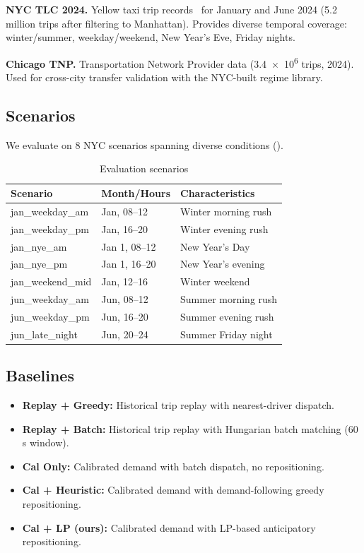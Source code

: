 \documentclass[conference,10pt]{IEEEtran}
\begin{document}
\textbf{NYC TLC 2024.} Yellow taxi trip records~\cite{nyctlc2024} for January and June
2024 (5.2 million trips after filtering to Manhattan). Provides diverse
temporal coverage: winter/summer, weekday/weekend, New Year's Eve,
Friday nights.

\textbf{Chicago TNP.} Transportation Network Provider data
(\num{3.4e6} trips, 2024). Used for cross-city transfer validation
with the NYC-built regime library.

\subsection{Scenarios}

We evaluate on 8 NYC scenarios spanning diverse conditions
().

\begin{table}[t]
  \centering
  \caption{Evaluation scenarios}
  \label{tab:scenarios}
  \begin{tabular}{@{}lll@{}}
    \toprule
    Scenario & Month/Hours & Characteristics \\
    \midrule
    jan\_weekday\_am & Jan, 08--12 & Winter morning rush \\
    jan\_weekday\_pm & Jan, 16--20 & Winter evening rush \\
    jan\_nye\_am & Jan 1, 08--12 & New Year's Day \\
    jan\_nye\_pm & Jan 1, 16--20 & New Year's evening \\
    jan\_weekend\_mid & Jan, 12--16 & Winter weekend \\
    jun\_weekday\_am & Jun, 08--12 & Summer morning rush \\
    jun\_weekday\_pm & Jun, 16--20 & Summer evening rush \\
    jun\_late\_night & Jun, 20--24 & Summer Friday night \\
    \bottomrule
  \end{tabular}
\end{table}

\subsection{Baselines}

\begin{itemize}
  \item \textbf{Replay + Greedy:} Historical trip replay with nearest-driver dispatch.
  \item \textbf{Replay + Batch:} Historical trip replay with Hungarian batch matching (60\,s window).
  \item \textbf{Cal Only:} Calibrated demand with batch dispatch, no repositioning.
  \item \textbf{Cal + Heuristic:} Calibrated demand with demand-following greedy repositioning.
  \item \textbf{Cal + LP (ours):} Calibrated demand with LP-based anticipatory repositioning.
\end{itemize}
\end{document}
